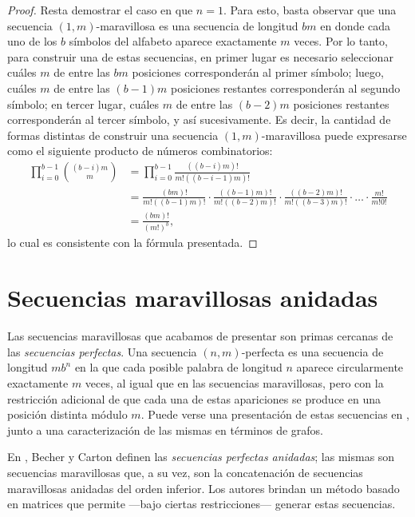 \begin{proof}
	Resta demostrar el caso en que $n = 1$. Para esto, basta observar que una
	secuencia $(1,m)$-maravillosa es una secuencia de longitud $bm$ en donde
	cada uno de los $b$ símbolos del alfabeto aparece exactamente $m$ veces.
	Por lo tanto, para construir una de estas secuencias, en primer lugar es
	necesario seleccionar cuáles $m$ de entre las $bm$ posiciones corresponderán
	al primer símbolo; luego, cuáles $m$ de entre las $(b - 1)m$ posiciones
	restantes corresponderán al segundo símbolo; en tercer lugar, cuáles $m$ de
	entre las $(b - 2)m$ posiciones restantes corresponderán al tercer símbolo,
	y así sucesivamente. Es decir, la cantidad de formas distintas de construir
	una secuencia $(1,m)$-maravillosa puede expresarse como el siguiente producto
	de números combinatorios:
	\begin{align*}
		\prod_{i = 0}^{b - 1} \binom{(b - i)m}{m}
			&= \prod_{i = 0}^{b - 1} \frac{((b-i)m)!}{m!((b-i-1)m)!} \\
			&= \frac{(bm)!}{m!((b-1)m)!} \cdot
				\frac{((b-1)m)!}{m!((b-2)m)!} \cdot
				\frac{((b-2)m)!}{m!((b-3)m)!} \cdot \dots \cdot
				\frac{m!}{m!0!} \\
			&= \frac{(bm)!}{(m!)^b},
		\end{align*}
	lo cual es consistente con la fórmula presentada.
\end{proof}

\section{Secuencias maravillosas anidadas}

Las secuencias maravillosas que acabamos de presentar son primas cercanas de
las \emph{secuencias perfectas}.
Una secuencia $(n,m)$-perfecta es una secuencia de longitud $m b^n$ en la
que cada posible palabra de longitud $n$ aparece circularmente exactamente
$m$ veces, al igual que en las secuencias maravillosas, pero con la restricción
adicional de que cada una de estas apariciones se produce en una posición
distinta módulo $m$.
Puede verse una presentación de estas secuencias en \cite{alvarez-perfect-necklaces},
junto a una caracterización de las mismas en términos de grafos.

En \cite{becher-nested-perfect}, Becher y Carton definen las \emph{secuencias
perfectas anidadas}; las mismas son secuencias maravillosas que, a su vez,
son la concatenación de secuencias maravillosas anidadas del orden inferior.
Los autores brindan un método basado en matrices que permite ---bajo ciertas
restricciones--- generar estas secuencias.

